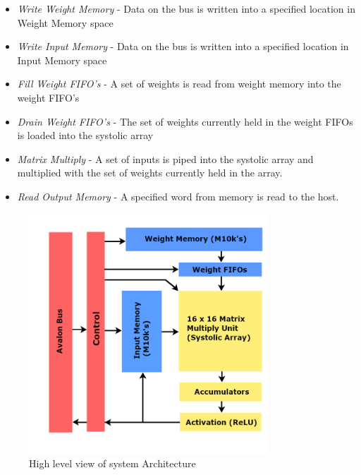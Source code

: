 \documentclass[11pt, conference, onecolumn]{IEEEtran}
\begin{document}
        \begin{center}
        \begin{itemize}

            \item{\textit{Write Weight Memory} - Data on the bus is written into a
            specified location in Weight Memory space}

            \item{\textit{Write Input Memory} - Data on the bus is written into a
            specified location in Input Memory space}

            \item{\textit{Fill Weight FIFO's} - A set of weights is read from weight
            memory into the weight FIFO's}

            \item{\textit{Drain Weight FIFO's} - The set of weights currently held in
            the weight FIFOs is loaded into the systolic array}

            \item{\textit{Matrix Multiply} - A set of inputs is piped into the systolic
            array and multiplied with the set of weights currently held in the array.}

            \item{\textit{Read Output Memory} - A specified word from memory is read to
            the host.}
        \end{itemize}
        \end{center}

        \begin{figure}[htbp]
            \centering
            \includegraphics[width=9cm]{../figures/sysArchitecture.png}
            \caption{High level view of system Architecture}
        \end{figure}
\end{document}
